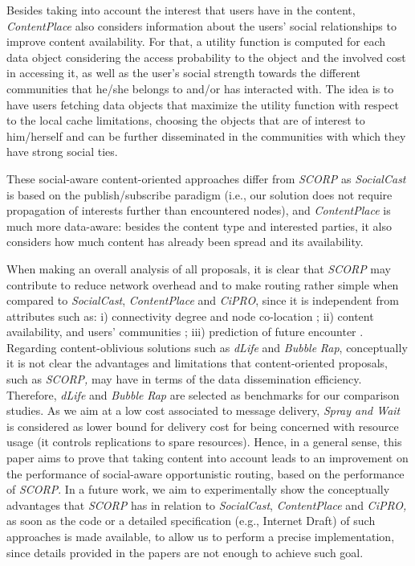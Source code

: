 \documentclass[lnicst]{svmultln}
\begin{document}
Besides taking into account the interest that users have in the content,\emph{
ContentPlace} \cite{contentplace} also considers information about
the users' social relationships to improve content availability. For
that, a utility function is computed for each data object considering
the access probability to the object and the involved cost in accessing
it, as well as the user's social strength towards the different communities
that he/she belongs to and/or has interacted with. The idea is to
have users fetching data objects that maximize the utility function
with respect to the local cache limitations, choosing the objects
that are of interest to him/herself and can be further disseminated
in the communities with which they have strong social ties.

These social-aware content-oriented approaches differ from \emph{SCORP}
as \emph{SocialCast} is based on the publish/subscribe paradigm (i.e.,
our solution does not require propagation of interests further than
encountered nodes), and \emph{ContentPlace} is much more data-aware:
besides the content type and interested parties, it also considers
how much content has already been spread and its availability. 

When making an overall analysis of all proposals, it is clear that
\emph{SCORP} may contribute to reduce network overhead and to make
routing rather simple when compared to \emph{SocialCast}, \emph{ContentPlace}
and \emph{CiPRO}, since it is independent from attributes such as:
i) connectivity degree and node co-location \cite{socialcast}; ii)
content availability, and users' communities \cite{contentplace};
iii) prediction of future encounter \cite{cipro}. Regarding content-oblivious
solutions such as \emph{dLife} and \emph{Bubble} \emph{Rap}, conceptually
it is not clear the advantages and limitations that content-oriented
proposals, such as \emph{SCORP,} may have in terms of the data dissemination
efficiency. Therefore, \emph{dLife} and \emph{Bubble} \emph{Rap} are
selected as benchmarks for our comparison studies. As we aim at a
low cost associated to message delivery, \emph{Spray and Wait }\cite{spraywait}
is considered as lower bound for delivery cost for being concerned
with resource usage (it controls replications to spare resources).
Hence, in a general sense, this paper aims to prove that taking content
into account leads to an improvement on the performance of social-aware
opportunistic routing, based on the performance of \emph{SCORP}. In
a future work, we aim to experimentally show the conceptually advantages
that \emph{SCORP} has in relation to \emph{SocialCast}, \emph{ContentPlace}
and \emph{CiPRO, }as soon as the code or a detailed specification
(e.g., Internet Draft) of such approaches is made available, to allow
us to perform a precise implementation, since details provided in
the papers are not enough to achieve such goal.
\end{document}
